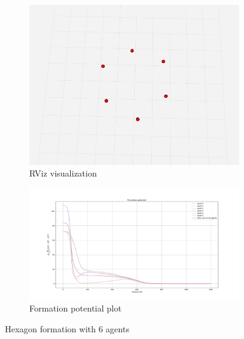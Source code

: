 \documentclass[a4paper,11pt,oneside]{book}
\begin{document}
\begin{figure}
\centering
	\begin{subfigure}{0.49\textwidth}	
	\includegraphics[scale=0.24]{hexagon_rviz}
	\caption{RViz visualization}
	\end{subfigure}
\hfill
	\begin{subfigure}{0.49\textwidth}	
	\includegraphics[scale=0.42]{Task-2.2_Formation-p_No-Coll-Avoid_Hexagon}
	\caption{Formation potential plot}
	\end{subfigure}
\caption{Hexagon formation with $6$ agents}
\label{Hexagon}
\end{figure}
\end{document}
